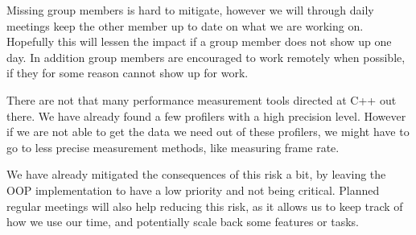 Missing group members is hard to mitigate, however 
we will through daily meetings keep the other member
up to date on what we are working on. 
Hopefully this will lessen the impact if a group member
does not show up one day.
In addition group members are encouraged to work remotely when possible,
if they for some reason cannot show up for work.

There are not that many performance measurement tools
directed at C++ out there. 
We have already found a few profilers with a high precision level. 
However if we are not able to get the data we need out of these profilers,
we might have to go to less precise measurement methods,
like measuring frame rate.

We have already mitigated the consequences of this risk a bit, by leaving the OOP
implementation to have a low priority and not being critical.
Planned regular meetings will also help reducing this risk, as it allows us to keep 
track of how we use our time, and potentially scale back some features or tasks.